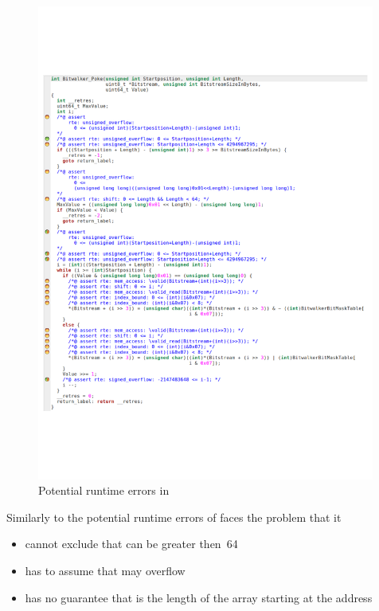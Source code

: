 \begin{figure}[hbt]
\begin{center}
\includegraphics[width=0.99\textwidth]{figures/poke-wp.pdf}
\caption{\label{fig:poke-wp} Potential runtime errors in \peek}
\end{center}
\end{figure}

Similarly to the potential runtime errors of \peek \framacwp
faces the problem that it

\begin{itemize}
\item cannot exclude that  can be greater then~64 
\item has to assume that  may overflow
\item has no guarantee that  is the length 
      of the array starting at the address 
\end{itemize}

